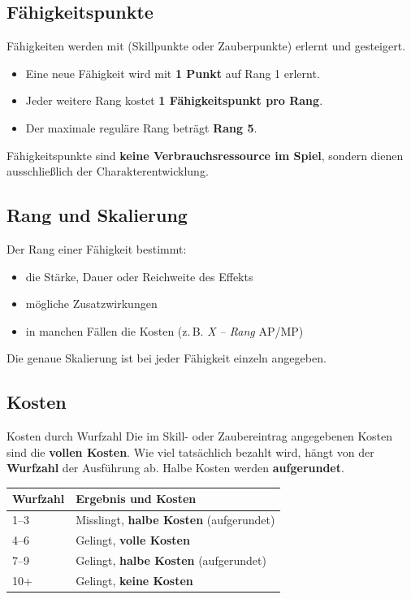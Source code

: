 \subsection*{Fähigkeitspunkte}

Fähigkeiten werden mit 
(Skillpunkte oder Zauberpunkte) erlernt und gesteigert.

\begin{itemize}
	\item Eine neue Fähigkeit wird mit \textbf{1 Punkt} auf Rang 1 erlernt.
	\item Jeder weitere Rang kostet \textbf{1 Fähigkeitspunkt pro Rang}.
	\item Der maximale reguläre Rang beträgt \textbf{Rang 5}.
\end{itemize}

Fähigkeitspunkte sind \textbf{keine Verbrauchsressource im Spiel},
sondern dienen ausschließlich der Charakterentwicklung.

\subsection*{Rang und Skalierung}

Der Rang einer Fähigkeit bestimmt:
\begin{itemize}
	\item die Stärke, Dauer oder Reichweite des Effekts
	\item mögliche Zusatzwirkungen
	\item in manchen Fällen die Kosten (z.\,B. \textit{X -- Rang} AP/MP)
\end{itemize}

Die genaue Skalierung ist bei jeder Fähigkeit einzeln angegeben.

\subsection*{Kosten}

\begin{rulebox}{Kosten durch Wurfzahl}
	Die im Skill- oder Zaubereintrag angegebenen Kosten sind die \textbf{vollen Kosten}.
	Wie viel tatsächlich bezahlt wird, hängt von der \textbf{Wurfzahl} der Ausführung ab.
	Halbe Kosten werden \textbf{aufgerundet}.
\end{rulebox}

\begin{center}
	\begin{tabular}{lp{9cm}}
		\toprule
		\textbf{Wurfzahl} & \textbf{Ergebnis und Kosten} \\
		\midrule
		1--3  & Misslingt, \textbf{halbe Kosten} (aufgerundet) \\
		4--6  & Gelingt, \textbf{volle Kosten} \\
		7--9  & Gelingt, \textbf{halbe Kosten} (aufgerundet) \\
		10+   & Gelingt, \textbf{keine Kosten} \\
		\bottomrule
	\end{tabular}
\end{center}


